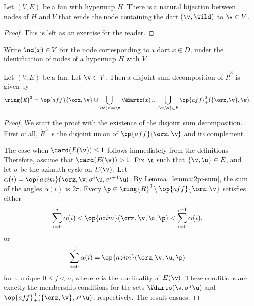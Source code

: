 
\begin{lemma}[]\label{lemma:node-vertex}
Let $(V,E)$ be a fan with hypermap $H$.  There is a natural bijection between
nodes of $H$ and $V$ that sends the node containing the dart $(\v,\wild)$
to $\v\in V$.
\end{lemma}

\begin{proof}  This is left as an exercise for the reader.
\end{proof}

\begin{definition}[$\nd$]
Write $\nd(x)\in V$ for the node corresponding to a dart $x\in D$,
under the identification of nodes of a hypermap $H$ with $V$.
\end{definition}

\begin{lemma}\label{lemma:disjoint}
  Let $(V,E)$ be a fan.  Let $\v\in V$.  Then  a disjoint sum
  decomposition of $\ring{R}^3$ is given by
\[ 
\ring{R}^3 = 
\op{aff}\{\orz,\v\} \cup
\bigcup_{\nd(x)=\v} \Wdarto(x)  \cup 
\bigcup_{\{\v,\w\}\in E} \op{aff}_+^0(\{\orz,\v\},\w).
\] 
\end{lemma}
%
%
%





\begin{proof}
We start the proof with the existence of the disjoint sum decomposition.
First of all, $\ring{R}^3$ is the disjoint union of $\op{aff}\{\orz,\v\}$
and its complement.

The case when $\card(E(\v))\le 1$ follows immediately from the
definitions.  Therefore, assume that $\card(E(\v)) >1$.  Fix $\u$ such
that $\{\v,\u\}\in E$, and let $\sigma$ be the azimuth cycle on
$E(\v)$.  Let $\alpha(i)=\op{azim}(\orz,\v,\sigma^i
\u,\sigma^{i+1}\u)$.  By Lemma~\ref{lemma:2pi-sum}, the sum of the
angles $\alpha(i)$ is $2\pi$.  Every
$\p\in\ring{R}^3\setminus\op{aff}\{\orz,\v\}$ satisfies either
\[ 
\sum_{i=0}^j \alpha(i) <
\op{azim}(\orz,\v,\u,\p) < \sum_{i=0}^{j+1} \alpha(i).
\] 
or 
\[ 
\sum_{i=0}^j \alpha(i) = \op{azim}(\orz,\v,\u,\p)
\] 
for a unique $0 \le j < n$, where $n$ is the cardinality of $E(\v)$. 
These conditions are exactly the membership conditions for the sets
$
\Wdarto(\v,\sigma^j \u)
$
and $\op{aff}_+^0(\{\orz,\v\},\sigma^j \u)$, respectively.
The result ensues.
\end{proof}

